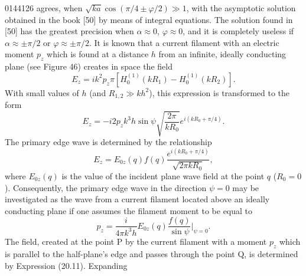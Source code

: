\begin{scanpage}{0144}{126}
agrees, when $\sqrt{ka}\cos(\pi/4\pm\varphi/2)\gg1$, with the asymptotic solution obtained in the book [50] by means of integral equations. The solution found in [50] has the greatest precision when $\alpha\approx0$, $\varphi\approx0$, and it is completely useless if $\alpha\approx\pm\pi/2$ or $\varphi\approx\pm\pi/2$.
It is known that a current filament with an electric moment $p_z$ which is found at a distance $h$ from an infinite, ideally conducting plane (see Figure 46) creates in space the field
\[
E_z=ik^2p_z\pi[H_0^{(1)}(kR_1)-H_0^{(1)}(kR_2)].\tag{22.01}
\]
With small values of $h$ (and $R_{1,2}\gg kh^2$), this expression is transformed to the form
\[
E_z=-i2p_zk^3h\sin\psi\sqrt{\frac{2\pi}{kR_0}}e^{i(kR_0+\pi/4)}.\tag{22.02}
\]
The primary edge wave is determined by the relationship
\[
E_z=E_{0z}(q)f(q)\frac{e^{i(kR_0+\pi/4)}}{\sqrt{2\pi kR_0}},\tag{22.03}
\]
where $E_{0z}(q)$ is the value of the incident plane wave field at the point $q$ ($R_0=0$). Consequently, the primary edge wave in the direction $\psi=0$ may be investigated as the wave from a current filament located above an ideally conducting plane if one assumes the filament moment to be equal to
\[
p_z=\frac{i}{4\pi k^3h}E_{0z}(q)\frac{f(q)}{\sin\psi}\bigg|_{\psi=0}.\tag{22.04}
\]
The field, created at the point P by the current filament with a moment $p_z$ which is parallel to the half-plane's edge and passes through the point Q, is determined by Expression (20.11). Expanding
\end{scanpage}

